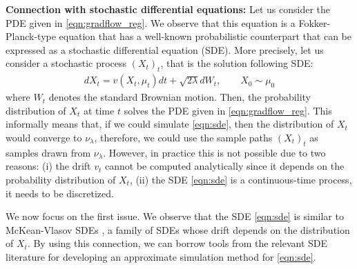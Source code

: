 \textbf{Connection with stochastic differential equations: }
%
Let us consider the PDE given in \eqref{eqn:gradflow_reg}. We observe that this equation is a Fokker-Planck-type equation \cite{bogachev2015fokker} that has a well-known probabilistic counterpart that can be expressed as a stochastic differential equation (SDE). More precisely, let us consider a stochastic process $(X_t)_{t}$, that is the solution following SDE:
\begin{align}
d X_t = v(X_t,\mu_t) dt + \sqrt{2 \lambda } d W_t, \qquad X_0 \sim \mu_0 \label{eqn:sde}
\end{align}
where $W_t$ denotes the standard Brownian motion. Then, the probability distribution of $X_t$ at time $t$ solves the PDE given in \eqref{eqn:gradflow_reg}. This informally means that, if we could simulate \eqref{eqn:sde}, then the distribution of $X_t$ would converge to $\nu_\lambda$, therefore, we could use the sample paths $(X_t)_t$ as samples drawn from $\nu_\lambda$. However, in practice this is not possible due to two reasons: (i) the drift $v_t$ cannot be computed analytically since it depends on the probability distribution of $X_t$, (ii) the SDE \eqref{eqn:sde} is a continuous-time process, it needs to be discretized.







We now focus on the first issue.
We observe that the SDE \eqref{eqn:sde} is similar to McKean-Vlasov SDEs \cite{veretennikov2006ergodic,mishura2016existence}, a family of SDEs whose drift depends on the distribution of $X_t$. By using this connection, we can borrow tools from the relevant SDE literature \cite{malrieu03,cgm-08} for developing an approximate simulation method for \eqref{eqn:sde}.

